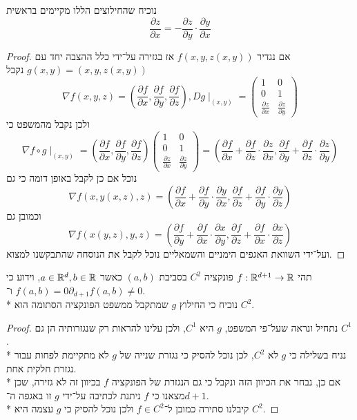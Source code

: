 \Subquestion{}
נוכיח שהחילוצים הללו מקיימים בראשית
\[
	\frac{\partial z}{\partial x}
	= - \frac{\partial z}{\partial y} \cdot \frac{\partial y}{\partial x}
\]
\begin{proof}
	אם נגדיר $f(x, y, z(x, y))$ אז בגזירה על־ידי כלל ההצבה יחד עם $g(x, y) = (x, y, z(x, y))$ נקבל
	\[
		\nabla f(x, y, z) = (\frac{\partial f}{\partial x}, \frac{\partial f}{\partial y}, \frac{\partial f}{\partial z}),
		Dg\mid_{(x, y)} = \begin{pmatrix}
			1 & 0 \\
			0 & 1 \\
			\frac{\partial z}{\partial x} & \frac{\partial z}{\partial y}
		\end{pmatrix}
	\]
	ולכן נקבל מהמשפט כי
	\[
		\nabla f \circ g \mid_{(x, y)}
		= (\frac{\partial f}{\partial x}, \frac{\partial f}{\partial y}, \frac{\partial f}{\partial z})
		\begin{pmatrix}
			1 & 0 \\
			0 & 1 \\
			\frac{\partial z}{\partial x} & \frac{\partial z}{\partial y}
		\end{pmatrix}
		= (\frac{\partial f}{\partial x} + \frac{\partial f}{\partial z} \cdot \frac{\partial z}{\partial x}, \frac{\partial f}{\partial y} + \frac{\partial f}{\partial z} \cdot \frac{\partial z}{\partial y})
	\]
	נוכל אם כן לקבל באופן דומה כי גם
	\[
		\nabla f(x, y(x, z), z)
		= (\frac{\partial f}{\partial x} + \frac{\partial f}{\partial y} \cdot \frac{\partial y}{\partial x}, \frac{\partial f}{\partial z} + \frac{\partial f}{\partial y} \cdot \frac{\partial y}{\partial z})
	\]
	וכמובן גם
	\[
		\nabla f(x(y, z), y, z)
		= (\frac{\partial f}{\partial y} + \frac{\partial f}{\partial x} \cdot \frac{\partial x}{\partial y}, \frac{\partial f}{\partial z} + \frac{\partial f}{\partial x} \cdot \frac{\partial x}{\partial z})
	\]
	ועל־ידי השוואת האגפים הימניים והשמאליים נוכל לקבל את הנוסחה שהתבקשנו למצוא.
\end{proof}

\Question{}
תהי $f : \mathbb{R}^{d + 1} \to \mathbb{R}$ פונקציה $C^2$ בסביבת $(a, b)$ כאשר $a \in \mathbb{R}^d, b \in \mathbb{R}$, וידוע כי $f(a, b) = 0$ ו־$\partial_{d + 1} f(a, b) \ne 0$. \\*
נוכיח כי החילוץ $g$ שמתקבל ממשפט הפונקציה הסתומה הוא $C^2$.
\begin{proof}
	נתחיל ונראה שעל־פי המשפט, $g$ היא $C^1$, ולכן עלינו להראות רק שנגזרותיה הן גם $C^1$. \\*
	נניח בשלילה כי $g$ לא $C^2$, לכן נוכל להסיק כי נגזרת שנייה של $g$ לא מתקיימת לפחות עבור נגזרת חלקית אחת. \\*
	אם כן, נבחר את הכיוון הזה ונקבל כי גם הנגזרת של הפונקציה $f$ בכיוון זה לא גזירה, שכן מצאנו כי $f$ ניתנת לכתיבה על־ידי $g$ זו באגפה ה־$d + 1$. \\*
	קיבלנו סתירה כמובן ל־$f \in C^2$ ולכן נוכל להסיק כי $g$ עצמה היא $C^2$.
\end{proof}

